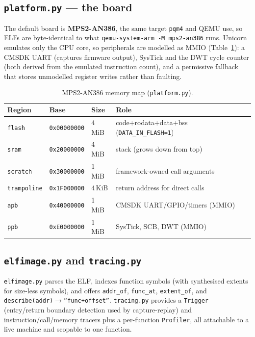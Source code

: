\documentclass[11pt]{article}
\newcommand{\code}[1]{\texttt{#1}}
\begin{document}
\subsection{\code{platform.py} --- the board}\label{sec:platform}
The default board is \textbf{MPS2-AN386}, the same target \code{pqm4} and QEMU use,
so ELFs are byte-identical to what \code{qemu-system-arm -M mps2-an386} runs.
Unicorn emulates only the CPU core, so peripherals are modelled as MMIO
(Table~\ref{tab:memmap}): a CMSDK UART (captures firmware output), SysTick and the
DWT cycle counter (both derived from the emulated instruction count), and a
permissive fallback that stores unmodelled register writes rather than faulting.

\begin{table}[h]
\centering\small
\caption{MPS2-AN386 memory map (\code{platform.py}).}
\label{tab:memmap}
\begin{tabular}{@{}llll@{}}
\toprule
Region & Base & Size & Role \\
\midrule
\code{flash}      & \code{0x00000000} & 4\,MiB & code+rodata+data+bss (\code{DATA\_IN\_FLASH=1}) \\
\code{sram}       & \code{0x20000000} & 4\,MiB & stack (grows down from top) \\
\code{scratch}    & \code{0x30000000} & 1\,MiB & framework-owned call arguments \\
\code{trampoline} & \code{0x1F000000} & 4\,KiB & return address for direct calls \\
\code{apb}        & \code{0x40000000} & 1\,MiB & CMSDK UART/GPIO/timers (MMIO) \\
\code{ppb}        & \code{0xE0000000} & 1\,MiB & SysTick, SCB, DWT (MMIO) \\
\bottomrule
\end{tabular}
\end{table}

\subsection{\code{elfimage.py} and \code{tracing.py}}
\code{elfimage.py} parses the ELF, indexes function symbols (with synthesised
extents for size-less symbols), and offers \code{addr\_of}, \code{func\_at},
\code{extent\_of}, and \code{describe(addr)$\to$``func+offset''}. \code{tracing.py}
provides a \code{Trigger} (entry/return boundary detection used by capture-replay)
and instruction/call/memory tracers plus a per-function \code{Profiler}, all
attachable to a live machine and scopable to one function.
\end{document}
